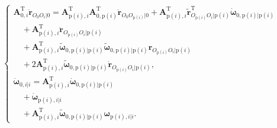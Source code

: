 \[
\begin{cases}
\boldsymbol{A}_{0,i}^{\mathrm{T}} \ddot{\boldsymbol{r}}_{O_0 O_i|0} = \boldsymbol{A}_{\mathrm{p}(i),i}^{\mathrm{T}} \boldsymbol{A}_{0,\mathrm{p}(i)}^{\mathrm{T}} \ddot{\boldsymbol{r}}_{O_0 O_{\mathrm{p}(i)}|0} + \boldsymbol{A}_{\mathrm{p}(i),i}^{\mathrm{T}} \tilde{\boldsymbol{r}}_{O_{\mathrm{p}(i)} O_i|\mathrm{p}(i)}^{\mathrm{T}} \dot{\boldsymbol{\omega}}_{0,\mathrm{p}(i)|\mathrm{p}(i)} \\
\quad + \boldsymbol{A}_{\mathrm{p}(i),i}^{\mathrm{T}} \ddot{\boldsymbol{r}}_{O_{\mathrm{p}(i)} O_i|\mathrm{p}(i)} \\
\quad + \boldsymbol{A}_{\mathrm{p}(i),i}^{\mathrm{T}} \tilde{\boldsymbol{\omega}}_{0,\mathrm{p}(i)|\mathrm{p}(i)} \tilde{\boldsymbol{\omega}}_{0,\mathrm{p}(i)|\mathrm{p}(i)} \boldsymbol{r}_{O_{\mathrm{p}(i)} O_i|\mathrm{p}(i)} \\
\quad + 2 \boldsymbol{A}_{\mathrm{p}(i),i}^{\mathrm{T}} \tilde{\boldsymbol{\omega}}_{0,\mathrm{p}(i)|\mathrm{p}(i)} \dot{\boldsymbol{r}}_{O_{\mathrm{p}(i)} O_i|\mathrm{p}(i)}, \\[6pt]
\dot{\boldsymbol{\omega}}_{0,i|i} = \boldsymbol{A}_{\mathrm{p}(i),i}^{\mathrm{T}} \dot{\boldsymbol{\omega}}_{0,\mathrm{p}(i)|\mathrm{p}(i)} \\
\quad + \dot{\boldsymbol{\omega}}_{\mathrm{p}(i),i|i} \\
\quad + \boldsymbol{A}_{\mathrm{p}(i),i}^{\mathrm{T}} \tilde{\boldsymbol{\omega}}_{0,\mathrm{p}(i)|\mathrm{p}(i)} \boldsymbol{\omega}_{\mathrm{p}(i),i|i}.
\end{cases}
\]


